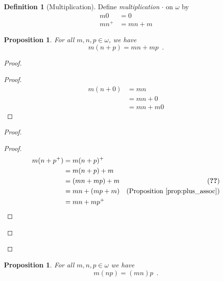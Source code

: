 \documentclass{report}
\let\qed\relax
\newtheorem{prop}[ax]{Proposition}
\theoremstyle{definition}
\newtheorem{df}[ax]{Definition}
\begin{document}
\begin{df}[Multiplication]
Define \emph{multiplication} $\cdot$ on $\omega$ by
\begin{align*}
	m0 & = 0\\
	mn^+ & = mn + m
\end{align*}
\end{df}

\begin{prop}
\label{prop:times_plus_distl}
For all $m,n,p \in \omega$, we have
\[ m(n+p) = mn + mp \enspace . \]
\end{prop}

\begin{proof}
\pf
{}
\begin{proof}
	\pf
	\begin{align*}
		m(n+0) & = mn \\
		& = mn + 0 \\
		& = mn + m0
	\end{align*}
\end{proof}
\begin{proof}
	\begin{proof}
		\pf
		\begin{align*}
			m(n+p^+) & = m(n+p)^+ \\
			& = m(n+p) + m \\
			& = (mn + mp) + m & (\text{\stepref{b}}) \\
			& = mn + (mp + m) & (\text{Proposition \ref{prop:plus_assoc}}) \\
			& = mn + mp^+
		\end{align*}
	\end{proof}
\end{proof}
\qed
\end{proof}

\begin{prop}
For all $m,n,p \in \omega$ we have
\[ m(np) = (mn)p \enspace . \]
\end{prop}
\end{document}
